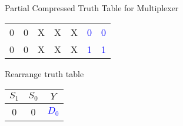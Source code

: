 \begin{frame}{Partial Compressed Truth Table for Multiplexer}
\begin{multicols}{2}
\begin{center}
\begin{tabular}{cc|cccc|c}
   0 & 0 & X & X & X & \textcolor{blue}{0} & \textcolor{blue}{0} \\
   0 & 0 & X & X & X & \textcolor{blue}{1} & \textcolor{blue}{1} \\
    \hline
		\end{tabular}
		\end{center}

  
Rearrange truth table
\begin{center}
\small
		\begin{tabular}{cc|c}
		 $S_1$ & $S_0$ & $Y$\\\hline
\hline		
   0 & 0 & \textcolor{blue}{$D_0$} \\
    \hline
		\end{tabular}
		\end{center}
  
  \end{multicols}
\end{frame}

